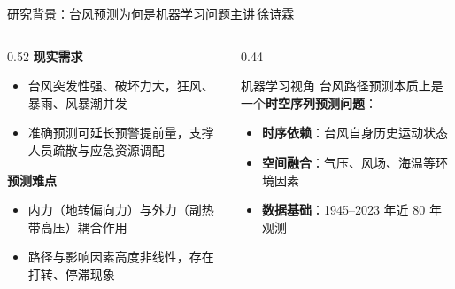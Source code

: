 \documentclass{beamer}
\newcommand{\speaker}[1]{\hfill{\normalfont\scriptsize\kaishu\color{uestc!30!white}主讲\,#1}}
\begin{document}
\begin{frame}{研究背景：台风预测为何是机器学习问题\speaker{徐诗霖}}
    \begin{columns}
        \begin{column}{0.52\textwidth}
            \textbf{现实需求}
            \begin{itemize}
                \item 台风突发性强、破坏力大，狂风、暴雨、风暴潮并发
                \item 准确预测可延长预警提前量，支撑人员疏散与应急资源调配
            \end{itemize}
            \vspace{0.4em}
            \textbf{预测难点}
            \begin{itemize}
                \item 内力（地转偏向力）与外力（副热带高压）耦合作用
                \item 路径与影响因素高度非线性，存在打转、停滞现象
            \end{itemize}
        \end{column}
        \begin{column}{0.44\textwidth}
            \begin{block}{机器学习视角}
                台风路径预测本质上是一个\textbf{时空序列预测问题}：
                \begin{itemize}
                    \item \textbf{时序依赖}：台风自身历史运动状态
                    \item \textbf{空间融合}：气压、风场、海温等环境因素
                    \item \textbf{数据基础}：1945--2023 年近 80 年观测
                \end{itemize}
            \end{block}
        \end{column}
    \end{columns}
\end{frame}
\end{document}
